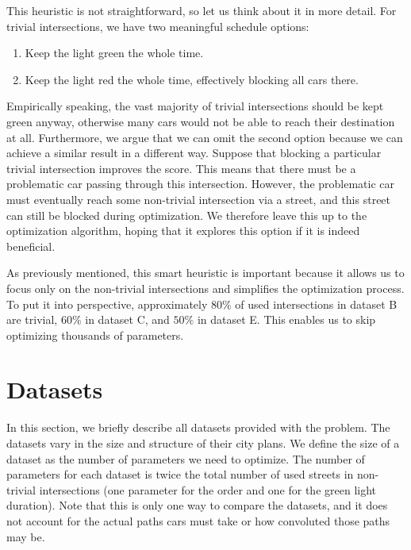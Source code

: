 This heuristic is not straightforward, so let us think about it in more detail. For trivial intersections, we have two meaningful schedule options:
\begin{enumerate}
    \item Keep the light green the whole time.
    \item Keep the light red the whole time, effectively blocking all cars there.
\end{enumerate}
Empirically speaking, the vast majority of trivial intersections should be kept green anyway, otherwise many cars would not be able to reach their destination at all.
Furthermore, we argue that we can omit the second option because we can achieve a similar result in a different way. Suppose that blocking a particular trivial intersection improves the score. This means that there must be a problematic car passing through this intersection. However, the problematic car must eventually reach some non-trivial intersection via a street, and this street can still be blocked during optimization. We therefore leave this up to the optimization algorithm, hoping that it explores this option if it is indeed beneficial.

As previously mentioned, this smart heuristic is important because it allows us to focus only on the non-trivial intersections and simplifies the optimization process. To put it into perspective, approximately $80 \%$ of used intersections in dataset B are trivial, $60 \%$ in dataset C, and $50 \%$ in dataset E. This enables us to skip optimizing thousands of parameters.

\section{Datasets} \label{sec:datasets}

In this section, we briefly describe all datasets provided with the problem. The datasets vary in the size and structure of their city plans. We define the size of a dataset as the number of parameters we need to optimize.
The number of parameters for each dataset is twice the total number of used streets in non-trivial intersections (one parameter for the order and one for the green light duration). Note that this is only one way to compare the datasets, and it does not account for the actual paths cars must take or how convoluted those paths may be.

